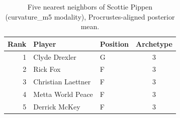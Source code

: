 \begin{table}[htbp]
  \centering\small
  \begin{tabular}{rllc}
    \toprule
    Rank & Player & Position & Archetype \\
    \midrule
    1 & Clyde Drexler & G & 3 \\
    2 & Rick Fox & F & 3 \\
    3 & Christian Laettner & F & 3 \\
    4 & Metta World Peace & F & 3 \\
    5 & Derrick McKey & F & 3 \\
    \bottomrule
  \end{tabular}
  \caption{Five nearest neighbors of Scottie Pippen (curvature_m5 modality), Procrustes-aligned posterior mean.}
  \label{tab:Scottie_Pippen_neighbors_curvature_m5}
\end{table}

